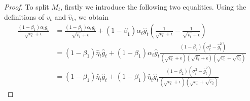 \begin{proof}
To split $M_t$, firstly we introduce the following two equalities. Using the definitions of $v_{t}$ and $\hat{v}_{t}$, we obtain
\[
   \begin{split}
       \frac{\left(1-\beta_1\right)\alpha_t \hat{g}_t}{\sqrt{v_t}+\epsilon} &= \frac{\left(1-\beta_1\right)\alpha_t \hat{g}_t}{\sqrt{\hat{v}_t}+\epsilon} + \left(1-\beta_1\right)\alpha_t\hat{g}_t\left(\frac{1}{\sqrt{v_t}+\epsilon} - \frac{1}{\sqrt{\hat{v}_t}+\epsilon}\right)\\
       & = \left(1-\beta_1\right)\hat{\eta}_t\hat{g}_t + \left(1-\beta_1\right)\alpha_t\hat{g}_t\frac{\left(1-\beta_2\right)\left(\sigma_t^2-\hat{g}_t^2\right)}{\left(\sqrt{v_t}+\epsilon\right)\left(\sqrt{\hat{v}_t}+\epsilon\right)\left(\sqrt{v_t} + \sqrt{\hat{v}_t}\right)}\\
       & = \left(1-\beta_1\right)\hat{\eta}_t\hat{g}_t + \left(1-\beta_1\right)\hat{\eta}_t\hat{g}_t\frac{\left(1-\beta_2\right)\left(\sigma_t^2-\hat{g}_t^2\right)}{\left(\sqrt{v_t}+\epsilon\right)\left(\sqrt{v_t} + \sqrt{\hat{v}_t}\right)}
   \end{split}
\]


\end{proof}

